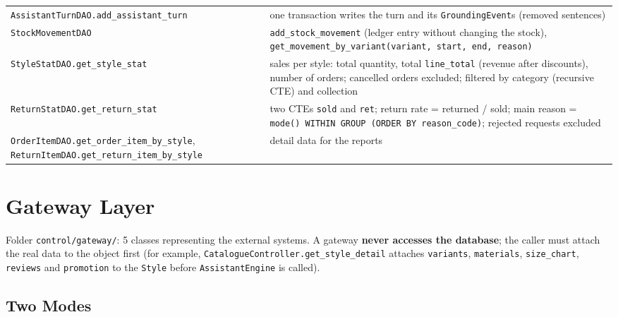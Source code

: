 {\begin{longtable}{@{}
  >{\raggedright\arraybackslash}p{}
  >{\raggedright\arraybackslash}p{}@{}}
\texttt{AssistantTurnDAO.\allowbreak{}add\_\allowbreak{}assistant\_\allowbreak{}turn} & one transaction writes
the turn and its \texttt{GroundingEvent}s (removed sentences) \\
\texttt{StockMovementDAO} & \texttt{add\_\allowbreak{}stock\_\allowbreak{}movement} (ledger entry
without changing the stock),
\texttt{get\_\allowbreak{}movement\_\allowbreak{}by\_\allowbreak{}variant(\allowbreak{}variant,\allowbreak{} start,\allowbreak{} end,\allowbreak{} reason)} \\
\texttt{StyleStatDAO.\allowbreak{}get\_\allowbreak{}style\_\allowbreak{}stat} & sales per style: total
quantity, total \texttt{line\_\allowbreak{}total} (revenue after discounts), number
of orders; cancelled orders excluded; filtered by category (recursive
CTE) and collection \\
\texttt{ReturnStatDAO.\allowbreak{}get\_\allowbreak{}return\_\allowbreak{}stat} & two CTEs \texttt{sold} and
\texttt{ret}; return rate = returned / sold; main reason =
\texttt{mode(\allowbreak{}) WITHIN GROUP (\allowbreak{}ORDER BY reason\_\allowbreak{}code)}; rejected
requests excluded \\
\texttt{OrderItemDAO.\allowbreak{}get\_\allowbreak{}order\_\allowbreak{}item\_\allowbreak{}by\_\allowbreak{}style},
\texttt{ReturnItemDAO.\allowbreak{}get\_\allowbreak{}return\_\allowbreak{}item\_\allowbreak{}by\_\allowbreak{}style} & detail data for
the reports \\
\end{longtable}}

\hypertarget{gateway-layer}{%
\section{Gateway Layer}\label{gateway-layer}}

Folder \texttt{control/\allowbreak{}gateway/\allowbreak{}}: 5 classes representing the external
systems. A gateway \textbf{never accesses the database}; the caller must
attach the real data to the object first (for example,
\texttt{CatalogueController.\allowbreak{}get\_\allowbreak{}style\_\allowbreak{}detail} attaches
\texttt{variants}, \texttt{materials}, \texttt{size\_\allowbreak{}chart},
\texttt{reviews} and \texttt{promotion} to the \texttt{Style} before
\texttt{AssistantEngine} is called).

\hypertarget{two-modes}{%
\subsection{Two Modes}\label{two-modes}}

